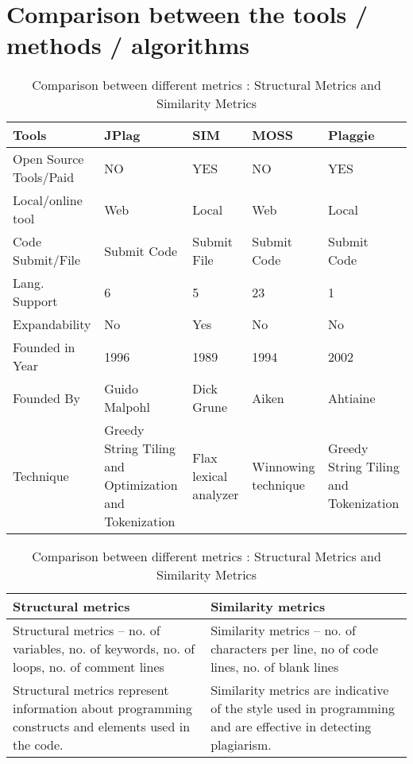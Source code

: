 				\section{Comparison between the tools / methods / algorithms}\begin{table}[!htbp]
				  \centering
				  \caption{Compression of four source code detection tools with its characteristics, function and technique}
				  \label{tab:table1}
				  \begin{tabular}{|p{3cm}|p{3cm}|p{3cm}|p{3cm}|p{3cm}|}
				\hline 
				Tools & JPlag & SIM & MOSS & Plaggie \\ \hline
				
				Open Source Tools/Paid & NO & YES & NO & YES \\ \hline
				Local/online tool & Web & Local & Web & Local  \\ \hline
				Code Submit/File & Submit Code & Submit File & Submit
				Code & Submit Code  \\ \hline
				Lang. Support & 6 & 5 & 23 & 1 \\ \hline
				Expandability & No & Yes & No & No \\ \hline
				Founded in Year & 1996 & 1989 & 1994 & 2002 \\ \hline
				Founded By  & Guido Malpohl & Dick Grune & Aiken & Ahtiaine \\ \hline
				
				Technique & Greedy String Tiling and Optimization and Tokenization & Flax lexical analyzer & Winnowing technique & Greedy String Tiling and Tokenization \\ \hline	\end{tabular}
				
				\vspace{40 mm}
				
				  \centering
				  \caption{Comparison between different metrics : Structural Metrics and Similarity Metrics}
				  \label{tab:table2}
				  \begin{tabular}{|p{6cm}|p{6cm}|}
				\hline 
				Structural metrics & Similarity metrics  \\ \hline
				
				Structural metrics – no. of variables, no. of keywords, no. of loops, no. of comment lines & Similarity metrics – no. of characters per line, no of code lines, no. of blank lines \\ \hline
				
				Structural metrics represent information about programming constructs and elements used in the code. & Similarity metrics are indicative of the style used in programming and are effective in detecting plagiarism. \\ \hline	
				

\end{tabular}
\end{table}
